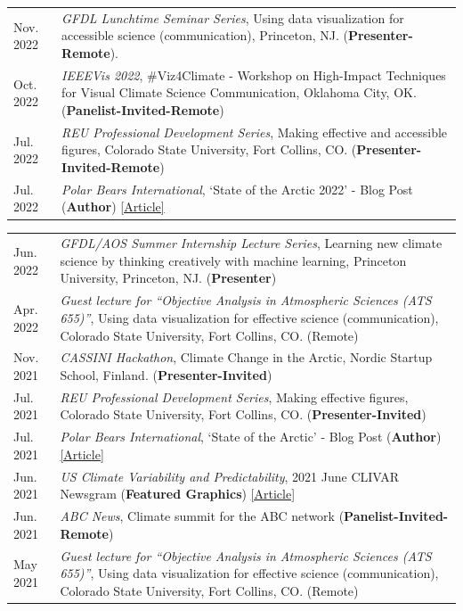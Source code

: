 \documentclass[margin,line,palatino,courier,10pt]{res}
\begin{document}
\begin{resume}
\begin{tabular}{@{}p{0.9in}p{4in}}
Nov. 2022 & \textit{GFDL Lunchtime Seminar Series}, Using data visualization for accessible science (communication), Princeton, NJ. (\textbf{Presenter-Remote}).\\
Oct. 2022 & \textit{IEEEVis 2022}, \#Viz4Climate - Workshop on High-Impact Techniques for Visual Climate Science Communication, Oklahoma City, OK. (\textbf{Panelist-Invited-Remote})\\
Jul. 2022 & \textit{REU Professional Development Series}, Making effective and accessible figures, Colorado State University, Fort Collins, CO. (\textbf{Presenter-Invited-Remote})\\
Jul. 2022 & \textit{Polar Bears International}, `State of the Arctic 2022' - Blog Post (\textbf{Author}) \href{https://polarbearsinternational.org/news-media/articles/arctic-sea-ice-conditions-2022}{[Article]}\\
\end{tabular}
\begin{tabular}{@{}p{0.9in}p{4in}}
Jun. 2022 & \textit{GFDL/AOS Summer Internship Lecture Series}, Learning new climate science by thinking creatively with machine learning, Princeton University, Princeton, NJ. (\textbf{Presenter})\\
Apr. 2022 & \textit{Guest lecture for ``Objective Analysis in Atmospheric Sciences (ATS 655)''}, Using data visualization for effective science (communication), Colorado State University, Fort Collins, CO. (Remote)\\
Nov. 2021 & \textit{CASSINI Hackathon}, Climate Change in the Arctic, Nordic Startup School, Finland. (\textbf{Presenter-Invited})\\
Jul. 2021 & \textit{REU Professional Development Series}, Making effective figures, Colorado State University, Fort Collins, CO. (\textbf{Presenter-Invited})\\
Jul. 2021 & \textit{Polar Bears International}, `State of the Arctic' - Blog Post (\textbf{Author}) \href{https://polarbearsinternational.org/news/article-climate-change/state-of-the-arctic/}{[Article]}\\
Jun. 2021 & \textit{US Climate Variability and Predictability}, 2021 June CLIVAR Newsgram (\textbf{Featured Graphics}) \href{https://mailchi.mp/usclivar/newsgram-2021june}{[Article]}\\
Jun. 2021 & \textit{ABC News}, Climate summit for the ABC network (\textbf{Panelist-Invited-Remote})\\
May 2021 & \textit{Guest lecture for ``Objective Analysis in Atmospheric Sciences (ATS 655)''}, Using data visualization for effective science (communication), Colorado State University, Fort Collins, CO. (Remote)\\

\end{tabular}
\end{resume}
\end{document}
